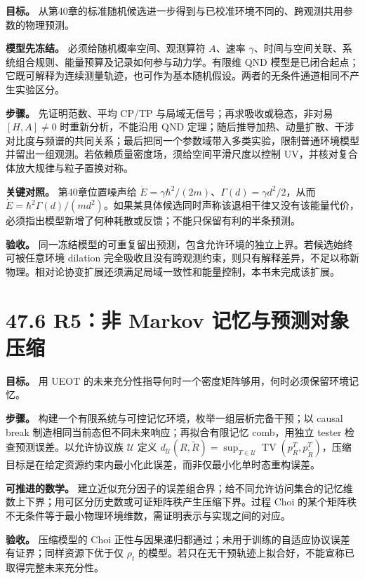 \documentclass[
  11pt,
  oneside]{book}
\begin{document}
\textbf{目标。}
从第40章的标准随机候选进一步得到与已校准环境不同的、跨观测共用参数的物理预测。

\textbf{模型先冻结。} 必须给随机概率空间、观测算符 \(A\)、速率
\(\gamma\)、时间与空间关联、系统组合规则、能量预算及记录如何参与动力学。有限维
QND
模型是已闭合起点；它既可解释为连续测量轨迹，也可作为基本随机假设。两者的无条件通道相同不产生实验区分。

\textbf{步骤。} 先证明范数、平均 CP/TP
与局域无信号；再求吸收或稳态，非对易 \([H,A]\ne0\) 时重新分析，不能沿用
QND
定理；随后推导加热、动量扩散、干涉对比度与频谱的共同关系；最后把同一个参数域带入多类实验，限制普通环境模型并留出一组观测。若依赖质量密度场，须给空间平滑尺度以控制
UV，并核对复合体放大规律与粒子置换对称。

\textbf{关键对照。} 第40章位置噪声给
\(\dot E=\gamma\hbar^2/(2m)\)、\(\Gamma(d)=\gamma d^2/2\)，从而
\(\dot E=\hbar^2\Gamma(d)/(md^2)\)。如果某具体候选同时声称该退相干律又没有该能量代价，必须指出模型新增了何种耗散或反馈；不能只保留有利的半条预测。

\textbf{验收。}
同一冻结模型的可重复留出预测，包含允许环境的独立上界。若候选始终可被任意环境
dilation
完全吸收且没有跨观测约束，则只有解释差异，不足以称新物理。相对论协变扩展还须满足局域一致性和能量控制，本书未完成该扩展。

\hypertarget{r5ux975e-markov-ux8bb0ux5fc6ux4e0eux9884ux6d4bux5bf9ux8c61ux538bux7f29}{%
\section{47.6 R5：非 Markov
记忆与预测对象压缩}\label{r5ux975e-markov-ux8bb0ux5fc6ux4e0eux9884ux6d4bux5bf9ux8c61ux538bux7f29}}

\textbf{目标。} 用 UEOT
的未来充分性指导何时一个密度矩阵够用，何时必须保留环境记忆。

\textbf{步骤。} 构建一个有限系统与可控记忆环境，枚举一组层析完备干预；以
causal break 制造相同当前态但不同未来响应；再拟合有限记忆 comb，用独立
tester 检查预测误差。以允许协议族 \(\mathcal U\) 定义
\(d_{\mathcal U}(R,\widetilde R)=\sup_{T\in\mathcal U}\operatorname{TV}(p_R^T,p_{\widetilde R}^T)\)，压缩目标是在给定资源约束内最小化此误差，而非仅最小化单时态重构误差。

\textbf{可推进的数学。}
建立近似充分因子的误差组合界；给不同允许访问集合的记忆维数上下界；用可区分历史数或可证矩阵秩产生压缩下界。过程
Choi
的某个矩阵秩不无条件等于最小物理环境维数，需证明表示与实现之间的对应。

\textbf{验收。} 压缩模型的 Choi
正性与因果递归都通过；未用于训练的自适应协议误差有证界；同样资源下优于仅
\(\rho_t\)
的模型。若只在无干预轨迹上拟合好，不能宣称已取得完整未来充分性。
\end{document}
